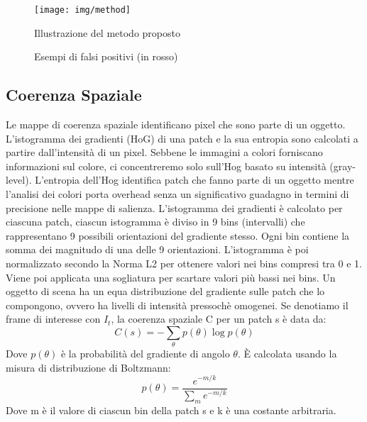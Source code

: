 \documentclass[12pt,oneside]{IEEEtran}
\begin{document}
		\begin{figure}[h]
		\caption{Illustrazione del metodo proposto}
		\begin{center}
		\texttt{[image: img/method]}
		\end{center}
		\end{figure}
		
		\begin{figure}[h]
		\caption{Esempi di falsi positivi (in rosso)}
		\begin{center}
		\hspace*{.2cm}
		\hspace*{.2cm}
		\end{center}
		\end{figure}
		
		\subsection{Coerenza Spaziale}
			Le mappe di coerenza spaziale identificano pixel che sono parte di un oggetto. L'istogramma dei gradienti (HoG) di una patch e la sua entropia sono calcolati a partire dall'intensità di un pixel. Sebbene le immagini a colori forniscano informazioni sul colore, ci concentreremo solo sull'Hog basato su intensità (gray-level). L'entropia dell'Hog identifica patch che fanno parte di un oggetto mentre l'analisi dei colori porta overhead senza un significativo guadagno in termini di precisione nelle mappe di salienza.\newline
			L'istogramma dei gradienti è calcolato per ciascuna patch, ciascun istogramma è diviso in 9 bins (intervalli) che rappresentano 9 possibili orientazioni del gradiente stesso. Ogni bin contiene la somma dei magnitudo di una delle 9 orientazioni. L'istogramma è poi normalizzato secondo la Norma L2 per ottenere valori nei bins compresi tra 0 e 1.
			Viene poi applicata una sogliatura per scartare valori più bassi nei bins.\newline
			Un oggetto di scena ha un equa distribuzione del gradiente sulle patch che lo compongono, ovvero ha livelli di intensità pressochè omogenei.	Se denotiamo il frame di interesse con $I_{t}$, la coerenza spaziale C per un patch s è data da:\newline
			\begin{equation}
			C(s) = -\sum_{\theta}p(\theta)\log p(\theta)
			\end{equation}
			Dove $p(\theta)$ è la probabilità del gradiente di angolo $\theta$. È calcolata usando la misura di distribuzione di Boltzmann:
			\begin{equation}
			p(\theta)= \frac{e^{-m/k}}{\sum_{m}e^{-m/k}}
			\end{equation}
			Dove m è il valore di ciascun bin della patch s e k è una costante arbitraria.
\end{document}
